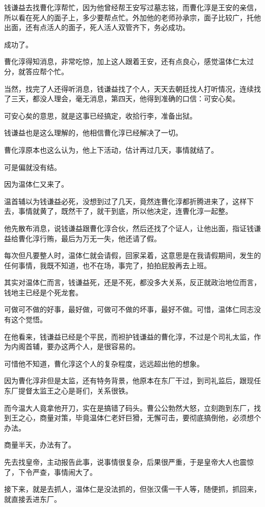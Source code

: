 \begin{multicols}{\theparacolNo}
钱谦益去找曹化淳帮忙，因为他曾经帮王安写过墓志铭，而曹化淳是王安的亲信，所以看在死人的面子上，多少要帮点忙。外加他的老师孙承宗，面子比较广，托他出面，还有点活人的面子，死人活人双管齐下，务必成功。

成功了。

曹化淳得知消息，非常吃惊，加上这人跟着王安，还有点良心，感觉温体仁太过分，就答应帮个忙。

当然，找完了人还得听消息，钱谦益找了个人，天天去朝廷找人打听情况，连续找了三天，都没人理会，毫无消息，第四天，他得到准确的口信：可安心矣。

可安心矣的意思，就是这事已经搞定，收拾行李，准备出狱。

钱谦益也是这么理解的，他相信曹化淳已经解决了一切。

曹化淳原本也这么认为，他上下活动，估计再过几天，事情就结了。

可是偏就没有结。

因为温体仁又来了。

温首辅以为钱谦益必死，没想到过了几天，竟然连曹化淳都折腾进来了，这样下去，事情就黄了，既然干了，就干到底，所以他决定，连曹化淳一起整。

他先散布消息，说钱谦益跟曹化淳合伙，然后还找了个证人，让他出面，指证钱谦益给曹化淳行贿，最后为万无一失，他还请了假。

每次但凡要整人时，温体仁就会请假，回家呆着，这意思是在我请假期间，发生的任何事情，我既不知道，也不在场，事完了，拍拍屁股再去上班。

其实对温体仁而言，钱谦益死，还是不死，都没多大关系，反正就政治地位而言，钱地主已经是个死龙套。

可做可不做的好事，最好做，可做可不做的坏事，最好不做。可惜，温体仁同志没有这个觉悟。

在他看来，钱谦益已经是个平民，而袒护钱谦益的曹化淳，不过是个司礼太监，作为内阁首辅，要办这两个人，是很容易的。

可惜他不知道，曹化淳这个人的复杂程度，远远超出他的想象。

因为曹化淳非但是太监，还有特务背景，他原本在东厂干过，到司礼监后，跟现任东厂提督太监王之心是哥们，关系很铁。

而今温大人竟拿他开刀，实在是搞错了码头。曹公公勃然大怒，立刻跑到东厂，找到王之心，商量对策，毕竟温体仁老奸巨猾，无懈可击，要彻底搞倒他，必须想个办法。

商量半天，办法有了。

先去找皇帝，主动报告此事，说事情很复杂，后果很严重，于是皇帝大人也震惊了，下令严查，事情闹大了。

接下来，就是去抓人，温体仁是没法抓的，但张汉儒一干人等，随便抓，抓回来，就直接丢进东厂。


\end{multicols}
